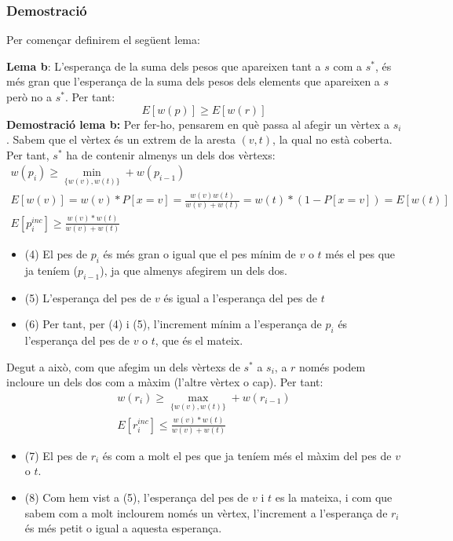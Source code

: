 \subsubsection{Demostració}
Per començar definirem el següent lema:
\par
\textbf{Lema b}: L'esperança de la suma dels pesos que apareixen tant a $s$ com a $s^{*}$, és més gran que l'esperança de la suma dels pesos dels elements que apareixen a $s$ però no a $s^{*}$. Per tant:
\[
E[w(p)] \geq E[w(r)]
\]
\textbf{Demostració lema b:}
\newline
Per fer-ho, pensarem en què passa al afegir un vèrtex a $s_i$. Sabem que el vèrtex és un extrem de la aresta $(v,t)$, la qual no està coberta. Per tant,  $s^{*}$ ha de contenir almenys un dels dos vèrtexs:
\begin{eqnarray}
    w(p_i) \geq \min_{\{w(v), w(t)\}}+w(p_{i-1}) \\
    E[w(v)] = w(v)*P[x=v]=\frac{w(v)w(t)}{w(v)+w(t)} = w(t)*(1-P[x=v]) = E[w(t)] \\
    E[p_i^{inc}] \geq \frac{w(v)*w(t)}{w(v)+w(t)}
\end{eqnarray}
\begin{itemize}
    \item (4) El pes de $p_i$ és més gran o igual que el pes mínim de $v$ o $t$ més el pes que ja teníem ($p_{i-1}$), ja que almenys afegirem un dels dos. 
    \item (5) L'esperança del pes de $v$ és igual a l'esperança del pes de $t$
    \item (6) Per tant, per (4) i (5), l'increment mínim a l'esperança de $p_i$ és l'esperança del pes de $v$ o $t$, que és el mateix.
\end{itemize}
Degut a això, com que afegim un dels vèrtexs de $s^{*}$ a $s_i$, a $r$ només podem incloure un dels dos com a màxim (l'altre vèrtex o cap). Per tant:
\begin{eqnarray}
    w(r_i) \geq \max_{\{w(v), w(t)\}}+w(r_{i-1}) \\
    E[r_i^{inc}] \leq \frac{w(v)*w(t)}{w(v)+w(t)}
\end{eqnarray}
\begin{itemize}
    \item (7) El pes de $r_i$ és com a molt el pes que ja teníem més el màxim del pes de $v$ o $t$.
    \item (8) Com hem vist a (5), l'esperança del pes de $v$ i $t$ es la mateixa, i com que sabem com a molt inclourem només un vèrtex, l'increment a l'esperança de $r_i$ és més petit o igual a aquesta esperança.
\end{itemize}
